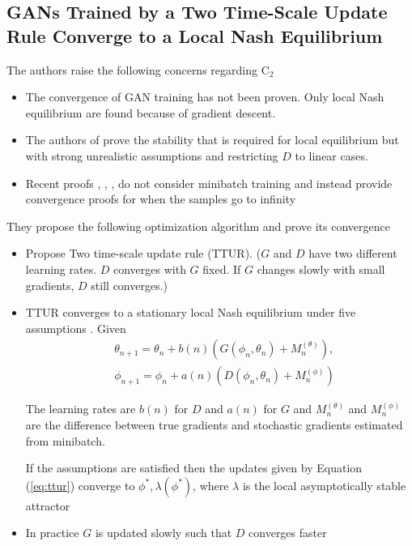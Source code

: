 \subsection*{GANs Trained by a Two Time-Scale Update Rule Converge to a Local Nash Equilibrium \citep{ttur}}
The authors raise the following concerns regarding C$_2$
\begin{itemize}
    \item The convergence of GAN training has not been proven. Only local Nash equilibrium are found because of gradient descent. 
    \item The authors of \citep{CMU17} prove the stability that is required for local equilibrium but with strong unrealistic assumptions and restricting $D$ to linear cases.
    \item Recent proofs  \citep{Arora03}, \citep{fisher}, \citep{app_conv}, \citep{mmd-gan}  do not consider minibatch training and instead provide convergence proofs for when the samples go to infinity
\end{itemize}{}
They propose the following optimization algorithm and prove its convergence
\begin{itemize}
    \item Propose Two time-scale update rule (TTUR). 
    ($G$ and $D$ have two different learning rates. $D$ converges with $G$ fixed. If $G$ changes slowly with small gradients, $D$ still converges.)
    \item TTUR converges to a stationary local Nash equilibrium under five assumptions \citep{ttur}. Given 
\begin{equation}
\label{eq:ttur}
\begin{aligned}
 &{\theta}_{n+1}={\theta}_{n}+b(n)\left(G\left({\phi}_{n}, {\theta}_{n}\right)+{M}_{n}^{(\theta)}\right), \\ &{\phi}_{n+1}={\phi}_{n}+a(n)\left({D}\left({\phi}_{n}, {\theta}_{n}\right)+{M}_{n}^{(\phi)}\right)
\end{aligned}{}
\end{equation}{}

   The learning rates are $b(n)$ for $D$ and $a(n)$ for $G$
    and ${M}_{n}^{(\theta)}$ and ${M}_{n}^{(\phi)}$ are the difference between true gradients and stochastic gradients estimated from minibatch.
    \begin{theorem}
    If the assumptions are satisfied then the updates given by Equation (\ref{eq:ttur}) converge to $\phi^*, \lambda(\phi^*)$, where $\lambda$ is the local asymptotically stable attractor
    \end{theorem}{}
    \item In practice $G$ is updated slowly such that $D$ converges faster
\end{itemize}{}

